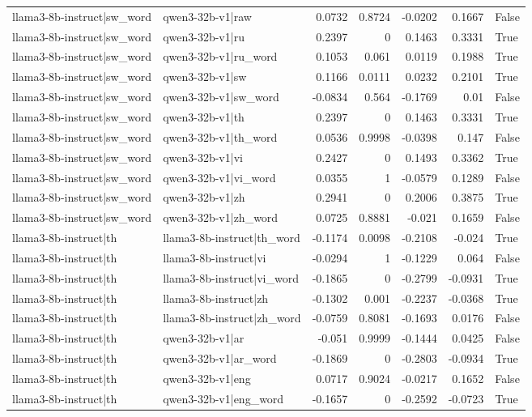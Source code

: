 \begin{table}
\begin{tabular}{l l r r r r l}
llama3-8b-instruct|sw_word & qwen3-32b-v1|raw & 0.0732 & 0.8724 & -0.0202 & 0.1667 & False \\
llama3-8b-instruct|sw_word & qwen3-32b-v1|ru & 0.2397 & 0 & 0.1463 & 0.3331 & True \\
llama3-8b-instruct|sw_word & qwen3-32b-v1|ru_word & 0.1053 & 0.061 & 0.0119 & 0.1988 & True \\
llama3-8b-instruct|sw_word & qwen3-32b-v1|sw & 0.1166 & 0.0111 & 0.0232 & 0.2101 & True \\
llama3-8b-instruct|sw_word & qwen3-32b-v1|sw_word & -0.0834 & 0.564 & -0.1769 & 0.01 & False \\
llama3-8b-instruct|sw_word & qwen3-32b-v1|th & 0.2397 & 0 & 0.1463 & 0.3331 & True \\
llama3-8b-instruct|sw_word & qwen3-32b-v1|th_word & 0.0536 & 0.9998 & -0.0398 & 0.147 & False \\
llama3-8b-instruct|sw_word & qwen3-32b-v1|vi & 0.2427 & 0 & 0.1493 & 0.3362 & True \\
llama3-8b-instruct|sw_word & qwen3-32b-v1|vi_word & 0.0355 & 1 & -0.0579 & 0.1289 & False \\
llama3-8b-instruct|sw_word & qwen3-32b-v1|zh & 0.2941 & 0 & 0.2006 & 0.3875 & True \\
llama3-8b-instruct|sw_word & qwen3-32b-v1|zh_word & 0.0725 & 0.8881 & -0.021 & 0.1659 & False \\
llama3-8b-instruct|th & llama3-8b-instruct|th_word & -0.1174 & 0.0098 & -0.2108 & -0.024 & True \\
llama3-8b-instruct|th & llama3-8b-instruct|vi & -0.0294 & 1 & -0.1229 & 0.064 & False \\
llama3-8b-instruct|th & llama3-8b-instruct|vi_word & -0.1865 & 0 & -0.2799 & -0.0931 & True \\
llama3-8b-instruct|th & llama3-8b-instruct|zh & -0.1302 & 0.001 & -0.2237 & -0.0368 & True \\
llama3-8b-instruct|th & llama3-8b-instruct|zh_word & -0.0759 & 0.8081 & -0.1693 & 0.0176 & False \\
llama3-8b-instruct|th & qwen3-32b-v1|ar & -0.051 & 0.9999 & -0.1444 & 0.0425 & False \\
llama3-8b-instruct|th & qwen3-32b-v1|ar_word & -0.1869 & 0 & -0.2803 & -0.0934 & True \\
llama3-8b-instruct|th & qwen3-32b-v1|eng & 0.0717 & 0.9024 & -0.0217 & 0.1652 & False \\
llama3-8b-instruct|th & qwen3-32b-v1|eng_word & -0.1657 & 0 & -0.2592 & -0.0723 & True \\

\end{tabular}
\end{table}
